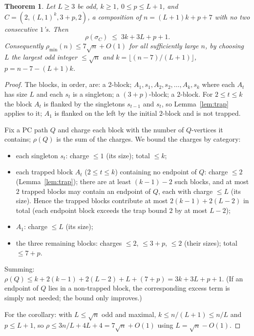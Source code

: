 \documentclass[11pt]{article}
\newtheorem{theorem}{Theorem}[section]
\theoremstyle{definition}
\newcommand{\pmin}{\rho_{\min}}
\begin{document}
\begin{theorem}\label{thm:trap-main}
Let $L \ge 3$ be odd, $k \ge 1$, $0 \le p \le L+1$, and
$C = (2, (L, 1)^k, 3+p, 2)$, a composition of $n = (L+1)k + p + 7$ with no two
consecutive $1$'s. Then
\[
\rho(\sigma_C) \;\le\; 3k + 3L + p + 1 .
\]
Consequently $\pmin(n) \le 7\sqrt n + O(1)$ for all sufficiently large $n$, by
choosing $L$ the largest odd integer $\le \sqrt n$ and
$k = \lfloor (n-7)/(L+1) \rfloor$, $p = n - 7 - (L+1)k$.
\end{theorem}

\begin{proof}
The blocks, in order, are: a $2$-block; $A_1, s_1, A_2, s_2, \dots, A_k, s_k$
where each $A_t$ has size $L$ and each $s_t$ is a singleton; a $(3+p)$-block; a
$2$-block. For $2 \le t \le k$ the block $A_t$ is flanked by the singletons
$s_{t-1}$ and $s_t$, so Lemma~\ref{lem:trap} applies to it; $A_1$ is flanked on
the left by the initial $2$-block and is not trapped.

Fix a PC path $Q$ and charge each block with the number of $Q$-vertices it
contains; $\rho(Q)$ is the sum of the charges. We bound the charges by category:
\begin{itemize}
\item each singleton $s_t$: charge $\le 1$ (its size); total $\le k$;
\item each trapped block $A_t$ ($2 \le t \le k$) containing no endpoint of $Q$:
charge $\le 2$ (Lemma~\ref{lem:trap}); there are at least $(k-1) - 2$ such blocks,
and at most $2$ trapped blocks may contain an endpoint of $Q$, each with charge
$\le L$ (its size). Hence the trapped blocks contribute at most
$2(k-1) + 2(L - 2)$ in total (each endpoint block exceeds the trap bound $2$ by at
most $L - 2$);
\item $A_1$: charge $\le L$ (its size);
\item the three remaining blocks: charges $\le 2$, $\le 3+p$, $\le 2$ (their
sizes); total $\le 7 + p$.
\end{itemize}
Summing: $\rho(Q) \le k + 2(k-1) + 2(L-2) + L + (7+p) = 3k + 3L + p + 1$.
(If an endpoint of $Q$ lies in a non-trapped block, the corresponding excess term
is simply not needed; the bound only improves.)

For the corollary: with $L \le \sqrt n$ odd and maximal,
$k \le n/(L+1) \le n/L$ and $p \le L + 1$, so
$\rho \le 3n/L + 4L + 4 = 7\sqrt n + O(1)$ using $L = \sqrt n - O(1)$.
\end{proof}
\end{document}
